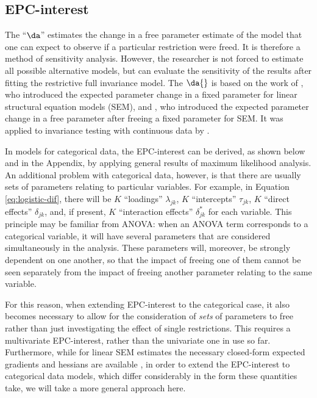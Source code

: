 \subsection{EPC-interest}
\label{sec:epc-interest}

The ``$\da$'' estimates the change in a free parameter estimate of the model that one can expect to observe if a particular restriction were freed. It is therefore a method of sensitivity analysis. However, the researcher is not forced to estimate all possible alternative models, but can evaluate the sensitivity of the results after fitting the restrictive full invariance model. 
The $\da{}$ is based on the work of \citet{saris_detection_1987}, who introduced the expected parameter change in a fixed parameter for linear structural equation models (SEM), and \citet{bentler1993some}, who introduced the expected parameter change in a free parameter after freeing a fixed parameter for SEM. It was applied to invariance testing with continuous data by \citet{Oberski:WP:EPC-interest}.

In models for categorical data, the EPC-interest can be derived, as shown below and in the Appendix, by applying general results of maximum likelihood analysis. An additional problem with categorical data, however, is that there are usually sets of parameters relating to particular variables. For example, in Equation \ref{eq:logistic-dif}, there will be $K$ ``loadings'' $\lambda_{jk}$, $K$ ``intercepts'' $\tau_{jk}$,  $K$ ``direct effects'' $\delta_{jk}$, and, if present, $K$ ``interaction effects'' $\delta^*_{jk}$ for each variable. This principle may be familiar from ANOVA: when an ANOVA term corresponds to a categorical variable, it will have several parameters that are considered simultaneously in the analysis. These parameters will, moreover, be strongly dependent on one another, so that the impact of freeing one of them cannot be seen separately from the impact of freeing another parameter relating to the same variable. 

For this reason, when extending EPC-interest to the categorical case, it also becomes necessary to allow for the consideration of \emph{sets} of parameters to free rather than just investigating the effect of single restrictions. This requires a multivariate EPC-interest, rather than the univariate one in use so far. Furthermore, while for linear SEM estimates the necessary closed-form expected gradients and hessians are available \citep{Oberski:WP:EPC-interest}, in order to extend the EPC-interest to categorical data models, which differ considerably in the form these quantities take, we will take a more general approach here.


